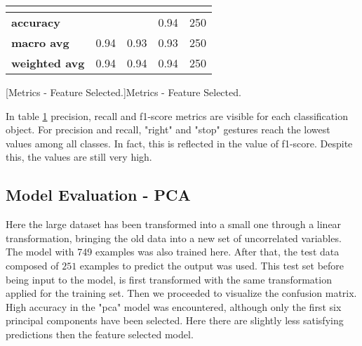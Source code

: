 \begin{table}[h]
\begin{tabular}{|lllll|}
        \multicolumn{5}{|l|}{}                                                                                                                                                                   \\ \hline
        \multicolumn{1}{|l|}{\textbf{accuracy}}     & \multicolumn{2}{l|}{}                                                          & \multicolumn{1}{l|}{0.94}              & 250              \\ \hline
        \multicolumn{1}{|l|}{\textbf{macro avg}}    & \multicolumn{1}{l|}{0.94}               & \multicolumn{1}{l|}{0.93}            & \multicolumn{1}{l|}{0.93}              & 250              \\ \hline
        \multicolumn{1}{|l|}{\textbf{weighted avg}} & \multicolumn{1}{l|}{0.94}               & \multicolumn{1}{l|}{0.94}            & \multicolumn{1}{l|}{0.94}              & 250              \\ \hline
    \end{tabular}
	[Metrics - Feature Selected.]{Metrics - Feature Selected.}
    \label{tab:featuresel}
\end{table}

\noindent In table \ref{tab:featuresel} precision, recall and f1-score metrics are visible for each classification object. For precision and recall, "right" and "stop" gestures reach the lowest values among all classes. In fact, this is reflected in the value of f1-score. Despite this, the values are still very high. \\

\subsection{Model Evaluation - PCA}
\label{subsec:pcamodel}
\noindent Here the large dataset has been transformed into a small one through a linear transformation, bringing the old data into a new set of uncorrelated variables. The model with 749 examples was also trained here. After that, the test data composed of $251$ examples to predict the output was used. This test set before being input to the model, is first transformed with the same transformation applied for the training set. Then we proceeded to visualize the confusion matrix. High accuracy in the "\gls{pca}" model was encountered, although only the first six principal components have been selected. Here there are slightly less satisfying predictions then the feature selected model. \\


